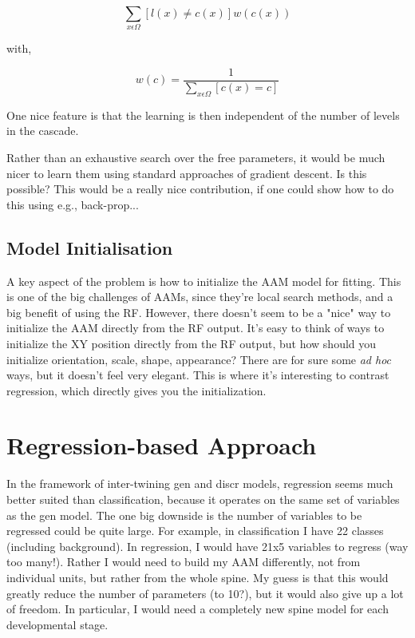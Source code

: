 \documentclass[10pt,twocolumn,letterpaper]{article}
\begin{document}
\[ \sum_{x \epsilon \Omega} [l(x) \neq c(x)] w(c(x)) \]

with,

\[ w(c) = \frac{1}{\sum_{x \epsilon \Omega} [c(x) = c]} \]

One nice feature is that the learning is then independent of the number of levels in the cascade.

Rather than an exhaustive search over the free parameters, it would be much nicer to learn them using standard approaches of gradient descent.  Is this possible?  This would be a really nice contribution, if one could show how to do this using e.g., back-prop...

\subsection{Model Initialisation}

A key aspect of the problem is how to initialize the AAM model for fitting.  This is one of the big challenges of AAMs, since they're local search methods, and a big benefit of using the RF.  However, there doesn't seem to be a "nice" way to initialize the AAM directly from the RF output.  It's easy to think of ways to initialize the XY position directly from the RF output, but how should you initialize orientation, scale, shape, appearance?  There are for sure some \emph{ad hoc} ways, but it doesn't feel very elegant.  This is where it's interesting to contrast regression, which directly gives you the initialization.

\section{Regression-based Approach}

In the framework of inter-twining gen and discr models, regression seems much better suited than classification, because it operates on the same set of variables as the gen model.  The one big downside is the number of variables to be regressed could be quite large.  For example, in classification I have 22 classes (including background).  In regression, I would have 21x5 variables to regress (way too many!).  Rather I would need to build my AAM differently, not from individual units, but rather from the whole spine.  My guess is that this would greatly reduce the number of parameters (to 10?), but it would also give up a lot of freedom.  In particular, I would need a completely new spine model for each developmental stage.
\end{document}
